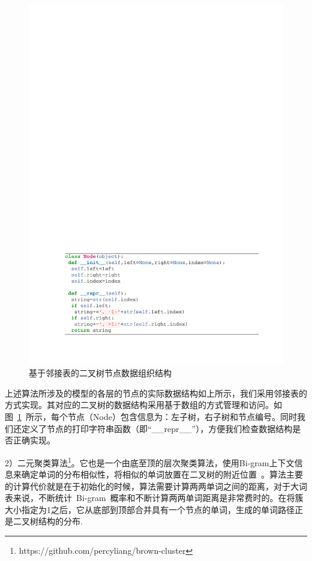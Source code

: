 \begin{figure}[!h]
  \centering
\includegraphics[width=1\linewidth]{./figures/node.pdf}
\caption{基于邻接表的二叉树节点数据组织结构}\label{fig:node}
\end{figure}

上述算法所涉及的模型的各层的节点的实际数据结构如上所示，我们采用邻接表的方式实现。其对应的二叉树的数据结构采用基于数组的方式管理和访问。如图~\ref{fig:node}~所示，每个节点（Node）包含信息为：左子树，右子树和节点编号。同时我们还定义了节点的打印字符串函数（即``\_\_repr\_\_''），方便我们检查数据结构是否正确实现。



2）二元聚类算法\footnote{https://github.com/percyliang/brown-cluster}。它也是一个由底至顶的层次聚类算法，使用Bi-gram上下文信息来确定单词的分布相似性，将相似的单词放置在二叉树的附近位置~。算法主要的计算代价就是在于初始化的时候，算法需要计算两两单词之间的距离，对于大词表来说，不断统计~Bi-gram~概率和不断计算两两单词距离是非常费时的。在将簇大小指定为1之后，它从底部到顶部合并具有一个节点的单词，生成的单词路径正是二叉树结构的分布.%


